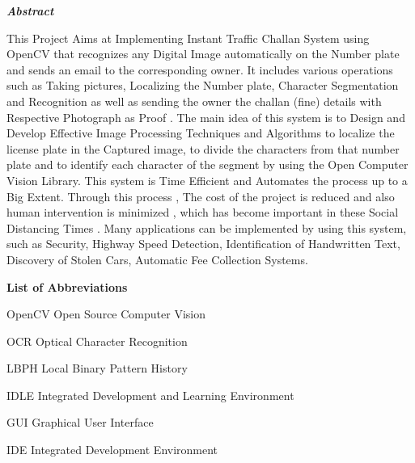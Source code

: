 \documentclass[12pt,a4paper]{report}
\begin{document}
\newpage
{}
\begin{center}
\textbf{\textit{\Large Abstract}}\\[1cm]
\end{center}
This Project Aims at Implementing Instant Traffic Challan System using OpenCV that recognizes any Digital Image automatically on the Number plate and sends an email to the corresponding owner. It includes various operations such as Taking pictures, Localizing the Number plate, Character Segmentation and Recognition as well as sending the owner the challan (fine) details with Respective Photograph as Proof . The main idea of this system is to Design and Develop Effective Image Processing Techniques and Algorithms to localize the license plate in the Captured image, to divide the characters from that number plate and to identify each character of the segment by using the Open Computer Vision Library. This system is Time Efficient and Automates the process up to a Big Extent. Through this process , The cost of the project is reduced and also human intervention is minimized , which has become important in these Social Distancing Times . Many applications can be implemented by using this system, such as Security, Highway Speed Detection, Identification of Handwritten Text, Discovery of Stolen Cars, Automatic Fee Collection Systems.
{\large  }
\newpage
{}
\listoffigures
\newpage
{}

\vspace*{0.5cm}
\begin{center}
\textbf{\Large List of Abbreviations}
\end{center}

 
\vspace{1cm}
\begin{abbrv}
\item[OpenCV] Open Source Computer Vision
\item[OCR] Optical Character Recognition
\item[LBPH] Local Binary Pattern History
\item[IDLE] Integrated Development and Learning Environment
\item[GUI] Graphical User Interface
\item[IDE] Integrated Development Environment
\end{abbrv}
\end{document}
